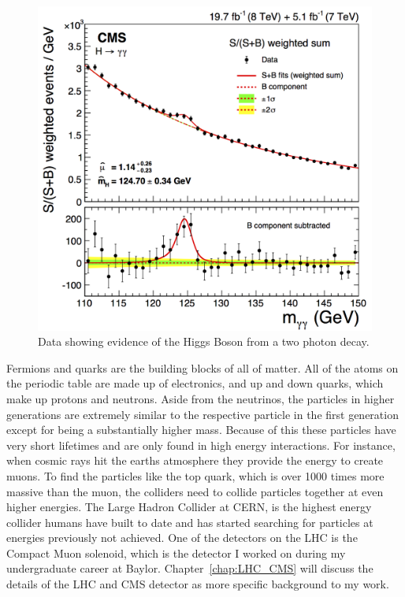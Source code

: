 \begin{figure}
\centering
\includegraphics[width=0.7\linewidth]{Figures/higgsmeasurement.png}
\caption{Data showing evidence of the Higgs Boson from a two photon decay.}
\label{fig:higgs}
\end{figure} 

Fermions and quarks are the building blocks of all of matter. All of the atoms on the periodic table are made up of electronics, and up and down quarks, which make up protons and neutrons. Aside from the neutrinos, the particles in higher generations are extremely similar to the respective particle in the first generation except for being a substantially higher mass. Because of this these particles have very short lifetimes and are only found in high energy interactions. For instance, when cosmic rays hit the earths atmosphere they provide the energy to create muons. To find the particles like the top quark, which is over 1000 times more massive than the muon, the colliders need to collide particles together at even higher energies. The Large Hadron Collider at CERN, is the highest energy collider humans have built to date and has started searching for particles at energies previously not achieved. One of the detectors on the LHC is the Compact Muon solenoid, which is the detector I worked on during my undergraduate career at Baylor. Chapter~\ref{chap:LHC_CMS} will discuss the details of the LHC and CMS detector as more specific background to my work. 